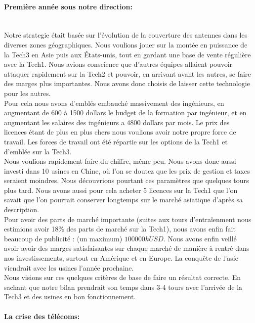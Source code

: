 \paragraph{Première année sous notre direction:}~\\
Notre strategie était basée sur l'évolution de la couverture des
antennes dans les diverses zones géographiques. Nous voulions jouer
sur la montée en puissance de la Tech3 en Asie puis aux États-unis,
tout en gardant une base de vente régulière avec la Tech1. Nous
avions conscience que d'autres équipes allaient pouvoir attaquer 
rapidement sur la Tech2 et pouvoir, en arrivant avant les autres,
se faire des marges plus importantes. Nous avons donc choisis de 
laisser cette technologie pour les autres.\\

Pour cela nous avons d'emblés embauché massivement des ingénieurs, 
en augmentant de 600 à 1500 dollars le budget de la formation par 
ingénieur, et en augmentant les salaires des ingénieurs a 4800
dollars par mois. Le prix des licences étant de plus en plus chers
nous voulions avoir notre propre force de travail.
Les forces de travail ont été répartie sur les options de la Tech1
et d'emblée sur la Tech3.\\

Nous voulions rapidement faire du chiffre, même peu. Nous avons donc 
aussi investi dans 10 usines en Chine, où l'on se doutez que les prix 
de gestion et taxes seraient moindres. Nous découvrions pourtant
ces paramètres que quelques tours plus tard. Nous avons aussi pour cela
acheter 5 licences sur la Tech1 que l'on savait que l'on pourrait 
conserver longtemps sur le marché asiatique d'après sa description.\\
 
Pour avoir des parts de marché importante (suites aux tours d'entraîenment
nous estimions avoir 18\% des parts de marché sur la Tech1), nous
avons enfin fait beaucoup de publicité : (un maximum) $100 000 kUSD$.
Nous avons enfin veillé avoir avoir des marges satisfaisantes sur chaque
marché de manière à rentré dans nos investissements, surtout en Amérique
et en Europe. La conquête de l'asie viendrait avec les usines l'année 
prochaine.\\

Nous visions sur ces quelques critères de base de faire un résultat
correcte. En sachant que notre bilan prendrait son temps dans 3-4 tours
avec l'arrivée de la Tech3 et des usines en bon fonctionnement.


\paragraph{La crise des télécoms:}~\\

